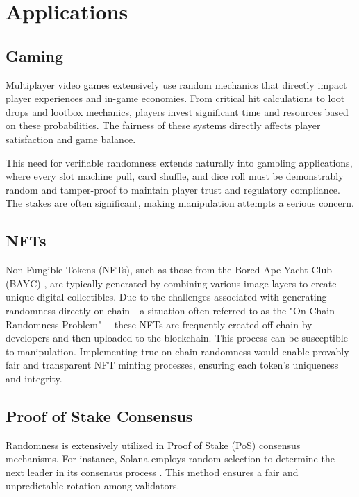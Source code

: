\section{Applications}\label{sec:applications}

\subsection{Gaming}\label{sec:applications_gaming}
Multiplayer video games extensively use random mechanics that directly impact player experiences and in-game economies. From critical hit calculations to loot drops and lootbox mechanics, players invest significant time and resources based on these probabilities. The fairness of these systems directly affects player satisfaction and game balance.

This need for verifiable randomness extends naturally into gambling applications, where every slot machine pull, card shuffle, and dice roll must be demonstrably random and tamper-proof to maintain player trust and regulatory compliance. The stakes are often significant, making manipulation attempts a serious concern.

\subsection{NFTs}\label{sec:applications_nfts}
Non-Fungible Tokens (NFTs), such as those from the Bored Ape Yacht Club (BAYC) \cite{boredapeyachtclub}, are typically generated by combining various image layers to create unique digital collectibles. Due to the challenges associated with generating randomness directly on-chain—a situation often referred to as the "On-Chain Randomness Problem" —these NFTs are frequently created off-chain by developers and then uploaded to the blockchain. This process can be susceptible to manipulation. Implementing true on-chain randomness would enable provably fair and transparent NFT minting processes, ensuring each token's uniqueness and integrity.
\subsection{Proof of Stake Consensus}\label{sec:applications_defi}
Randomness is extensively utilized in Proof of Stake (PoS) consensus mechanisms.  For instance, Solana employs random selection to determine the next leader in its consensus process \cite{yakovenko2025solana}. This method ensures a fair and unpredictable rotation among validators.
